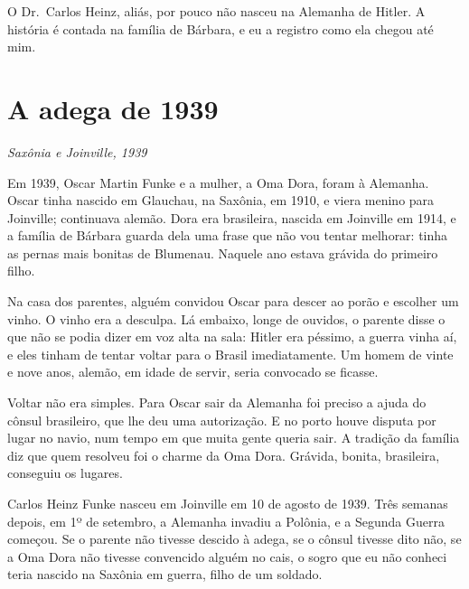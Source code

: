 \documentclass[
  brazilian,
  11pt,
  openany]{book}
\begin{document}
O Dr.~Carlos Heinz, aliás, por pouco não nasceu na Alemanha de Hitler. A
história é contada na família de Bárbara, e eu a registro como ela
chegou até mim.

\section{A adega de 1939}\label{a-adega-de-1939}

\emph{Saxônia e Joinville, 1939}

Em 1939, Oscar Martin Funke e a mulher, a Oma Dora, foram à Alemanha.
Oscar tinha nascido em Glauchau, na Saxônia, em 1910, e viera menino
para Joinville; continuava alemão. Dora era brasileira, nascida em
Joinville em 1914, e a família de Bárbara guarda dela uma frase que não
vou tentar melhorar: tinha as pernas mais bonitas de Blumenau. Naquele
ano estava grávida do primeiro filho.

Na casa dos parentes, alguém convidou Oscar para descer ao porão e
escolher um vinho. O vinho era a desculpa. Lá embaixo, longe de ouvidos,
o parente disse o que não se podia dizer em voz alta na sala: Hitler era
péssimo, a guerra vinha aí, e eles tinham de tentar voltar para o Brasil
imediatamente. Um homem de vinte e nove anos, alemão, em idade de
servir, seria convocado se ficasse.

Voltar não era simples. Para Oscar sair da Alemanha foi preciso a ajuda
do cônsul brasileiro, que lhe deu uma autorização. E no porto houve
disputa por lugar no navio, num tempo em que muita gente queria sair. A
tradição da família diz que quem resolveu foi o charme da Oma Dora.
Grávida, bonita, brasileira, conseguiu os lugares.

Carlos Heinz Funke nasceu em Joinville em 10 de agosto de 1939. Três
semanas depois, em 1º de setembro, a Alemanha invadiu a Polônia, e a
Segunda Guerra começou. Se o parente não tivesse descido à adega, se o
cônsul tivesse dito não, se a Oma Dora não tivesse convencido alguém no
cais, o sogro que eu não conheci teria nascido na Saxônia em guerra,
filho de um soldado.
\end{document}
